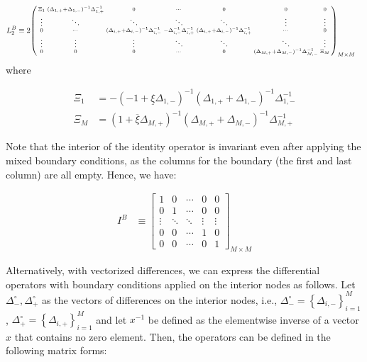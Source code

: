 \documentclass[11pt]{article}
\newcommand{\set}[1]{\ensuremath{\left\{{#1}\right\}}}
\newenvironment{psmallmatrix}
{\left(\begin{smallmatrix}}
	{\end{smallmatrix}\right)}
\theoremstyle{definition}
\begin{document}
\begin{align}
L_2^B &\equiv 2 \begin{psmallmatrix}
\Xi_1 &
(\Delta_{1,+}+\Delta_{1,-})^{-1} \Delta_{1,+}^{-1}
&0&\cdots&0&0&0 \\
\vdots&\ddots&\ddots&\ddots&\ddots&\vdots&\vdots\\
0&\cdots&
(\Delta_{i,+}+\Delta_{i,-})^{-1} \Delta_{i,-}^{-1} &
-\Delta_{i,-}^{-1} \Delta_{i,+}^{-1}  &
 (\Delta_{i,+}+\Delta_{i,-})^{-1} \Delta_{i,+}^{-1}&\cdots&0 \\
\vdots&\vdots&\vdots&\ddots&\ddots&\ddots&\vdots\\
0&0&0&\cdots&0&(\Delta_{M,+}+\Delta_{M,-})^{-1} \Delta_{M,-}^{-1}&\Xi_M
\end{psmallmatrix}_{M\times M}\label{eq:L-2} 
\end{align}
where

\begin{align}
\Xi_{1} &= - (-1 + \underline{\xi} \Delta_{1,-})^{-1} (\Delta_{1,+} + \Delta_{1,-})^{-1}  \Delta_{1,-}^{-1} \\
\Xi_{M} &=  (1 + \overline{\xi} \Delta_{M,+})^{-1} (\Delta_{M,+} + \Delta_{M,-})^{-1}  \Delta_{M,+}^{-1} 
\end{align}

Note that the interior of the identity operator is invariant even after applying the mixed boundary conditions, as the columns for the boundary (the first and last column) are all empty. Hence, we have:

\begin{align}
I^B &\equiv \begin{bmatrix}
1 & 0 & \cdots & 0 & 0 \\
0 & 1 & \cdots & 0 & 0 \\
\vdots  & \ddots & \ddots &  \vdots  & \vdots   \\
0 & 0 & \cdots & 1 & 0 \\
0 & 0 & \cdots & 0 & 1
\end{bmatrix}_{M\times M}
\end{align}



Alternatively, with vectorized differences, we can express the differential operators with boundary conditions applied on the interior nodes as follows. Let $\Delta_-^\circ, \Delta_+^\circ$ as the vectors of differences on the interior nodes, i.e., $\Delta_{-}^\circ = \set{\Delta_{i,-}}_{i=1}^M$, $\Delta_{+}^\circ = \set{\Delta_{i,+}}_{i=1}^M$ and let $x^{-1}$ be defined as the elementwise inverse of a vector $x$ that contains no zero element. Then, the operators can be defined in the following matrix forms:
\end{document}

